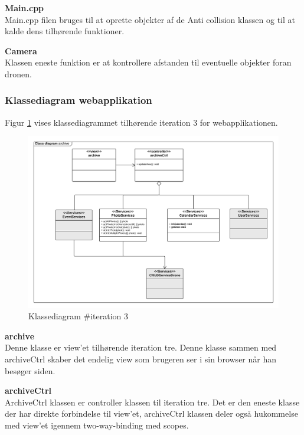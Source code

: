 \textbf{Main.cpp} \\
Main.cpp filen bruges til at oprette objekter af de Anti collision klassen og til at kalde dens tilhørende funktioner.

\textbf{Camera} \\
Klassen eneste funktion er at kontrollere afstanden til eventuelle objekter foran dronen. 


\newpage

\subsubsection*{Klassediagram webapplikation}

Figur \ref{fig:classDiagram_iteration3} vises klassediagrammet tilhørende iteration 3 for webapplikationen. 

\begin{figure}[H]
	\centering
	\includegraphics[width=1\textwidth]{Billeder/klasse_diagrammer/classdiagram_iteration3_server.png}
	\vspace{-0.5cm}
	\caption{Klassediagram \#iteration 3}
	\label{fig:classDiagram_iteration3}
\end{figure}

\textbf{archive}\\
Denne klasse er view'et tilhørende iteration tre. Denne klasse sammen med archiveCtrl skaber det endelig view som brugeren ser i sin browser når han besøger siden.

\textbf{archiveCtrl}\\
ArchiveCtrl klassen er controller klassen til iteration tre. Det er den eneste klasse der har direkte forbindelse til view'et, archiveCtrl klassen deler også hukommelse med view'et igennem two-way-binding med scopes.

